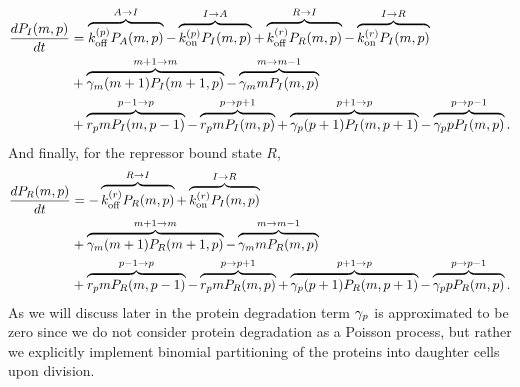\begin{equation}
  \begin{aligned}
    \dt{P_I(m, p)} &=
    \overbrace{\kpoff P_A(m, p)}^{A \rightarrow I} %
    - \overbrace{\kpon P_I(m, p)}^{I \rightarrow A} %
    + \overbrace{\kroff P_R(m, p)}^{R \rightarrow I} %
    - \overbrace{\kron P_I(m, p)}^{I \rightarrow R}\\ %
    &+ \overbrace{\gm (m + 1) P_I(m+1 , p)}^{m+1 \rightarrow m} %
    - \overbrace{\gm m P_I(m , p)}^{m \rightarrow m-1}\\ %
    &+ \overbrace{r_p m P_I(m, p - 1)}^{p-1 \rightarrow p} %
    - \overbrace{r_p m P_I(m, p)}^{p \rightarrow p+1} %
    + \overbrace{\gp (p + 1) P_I(m, p + 1)}^{p + 1 \rightarrow p} %
    - \overbrace{\gp p P_I(m, p)}^{p \rightarrow p-1}. %
  \end{aligned}
\end{equation}
And finally, for the repressor bound state $R$,
\begin{equation}
  \begin{aligned}
    \dt{P_R(m, p)} &=
    - \overbrace{\kroff P_R(m, p)}^{R \rightarrow I} %
    + \overbrace{\kron P_I(m, p)}^{I \rightarrow R}\\ %
    &+ \overbrace{\gm (m + 1) P_R(m+1 , p)}^{m+1 \rightarrow m} %
    - \overbrace{\gm m P_R(m , p)}^{m \rightarrow m-1}\\ %
    &+ \overbrace{r_p m P_R(m, p - 1)}^{p-1 \rightarrow p} %
    - \overbrace{r_p m P_R(m, p)}^{p \rightarrow p+1} %
    + \overbrace{\gp (p + 1) P_R(m, p + 1)}^{p + 1 \rightarrow p} %
    - \overbrace{\gp p P_R(m, p)}^{p \rightarrow p-1}. %
  \end{aligned}
\end{equation}
As we will discuss later in  the protein degradation
term $\gamma _p$ is approximated to be zero since we do not consider protein
degradation as a Poisson process, but rather we explicitly implement binomial
partitioning of the proteins into daughter cells upon division.

